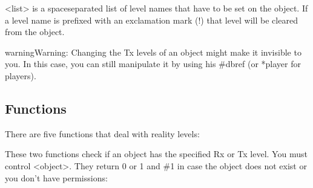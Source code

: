 \documentclass[letterpaper,10pt,english]{sphinxmanual}
\begin{document}
\begin{sphinxVerbatim}[commandchars=\\\{\}]
 
 
\end{sphinxVerbatim}

\sphinxAtStartPar
\textless{}list\textgreater{} is a space\sphinxhyphen{}separated list of level names that have to be set on the
object. If a level name is prefixed with an exclamation mark (!) that level
will be cleared from the object.

\begin{sphinxadmonition}{warning}{Warning:}
\sphinxAtStartPar
Changing the Tx levels of an object might make it invisible to you.
In this case, you can still manipulate it by using his \#dbref (or *player
for players).
\end{sphinxadmonition}


\subsection{Functions}
\label{\detokenize{advanced:functions}}
\sphinxAtStartPar
There are five functions that deal with reality levels:

\begin{sphinxVerbatim}[commandchars=\\\{\}]
\end{sphinxVerbatim}

\sphinxAtStartPar
These two functions check if an object has the specified Rx or Tx level.
You must control \textless{}object\textgreater{}. They return 0 or 1 and \#\sphinxhyphen{}1 in case the object
does not exist or you don’t have permissions:

\begin{sphinxVerbatim}[commandchars=\\\{\}]
\end{sphinxVerbatim}
\end{document}
